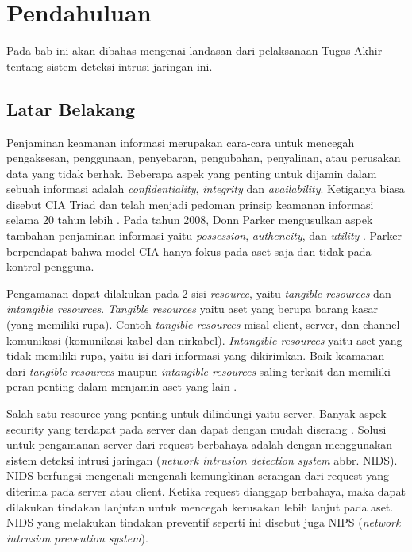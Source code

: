 \chapter{Pendahuluan}

  Pada bab ini akan dibahas mengenai landasan dari pelaksanaan Tugas Akhir tentang sistem deteksi intrusi jaringan ini.

\section{Latar Belakang}

  Penjaminan keamanan informasi merupakan cara-cara untuk mencegah pengaksesan, penggunaan, penyebaran, pengubahan, penyalinan, atau perusakan data yang tidak berhak. Beberapa aspek yang penting untuk dijamin dalam sebuah informasi adalah \emph{confidentiality}, \emph{integrity} dan \emph{availability}. Ketiganya biasa disebut CIA Triad dan telah menjadi pedoman prinsip keamanan informasi selama 20 tahun lebih \parencite{perrin2008}. Pada tahun 2008, Donn Parker mengusulkan aspek tambahan penjaminan informasi yaitu \emph{possession}, \emph{authencity}, dan \emph{utility} \parencite{parker1998}. Parker berpendapat bahwa model CIA hanya fokus pada aset saja dan tidak pada kontrol pengguna.

  Pengamanan dapat dilakukan pada 2 sisi \emph{resource}, yaitu \emph{tangible resources} dan \emph{intangible resources}. \emph{Tangible resources} yaitu aset yang berupa barang kasar (yang memiliki rupa). Contoh \emph{tangible resources} misal client, server, dan channel komunikasi (komunikasi kabel dan nirkabel). \emph{Intangible resources} yaitu aset yang tidak memiliki rupa, yaitu isi dari informasi yang dikirimkan. Baik keamanan dari \emph{tangible resources} maupun \emph{intangible resources} saling terkait dan memiliki peran penting dalam menjamin aset yang lain \parencite{kizza2015}.

  Salah satu resource yang penting untuk dilindungi yaitu server. Banyak aspek security yang terdapat pada server dan dapat dengan mudah diserang \parencite{owasp2013}. Solusi untuk pengamanan server dari request berbahaya adalah dengan menggunakan sistem deteksi intrusi jaringan (\emph{network intrusion detection system} abbr. NIDS). NIDS berfungsi mengenali mengenali kemungkinan serangan dari request yang diterima pada server atau client. Ketika request dianggap berbahaya, maka dapat dilakukan tindakan lanjutan untuk mencegah kerusakan lebih lanjut pada aset. NIDS yang melakukan tindakan preventif seperti ini disebut juga NIPS (\emph{network intrusion prevention system}).

